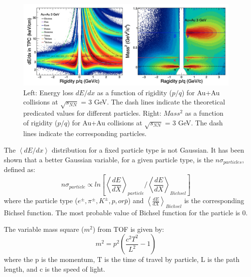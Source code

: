 \begin{figure}[ht]
\includegraphics [scale=0.3]{chapter2/fig/dedx_3gev.png}
\caption{Left: Energy loss $dE/dx$ as a function of rigidity ($p/q$) for Au+Au collisions at $\sqrt{s_{NN}}$ = 3 GeV. The dash lines indicate the theoretical predicated values for different particles. Right: $Mass^{2}$ as a function of rigidity ($p/q$) for Au+Au collisions at $\sqrt{s_{NN}}$ = 3 GeV. The dash lines indicate the corresponding particles.}
\label{fig:dedx_mass2_3gev} 
\end{figure}

The $\left<dE/dx\right>$ distribution for a fixed particle type is not Gaussian. It has been shown that a better Gaussian variable, for a given particle type, is the $n\sigma_{particles}$, defined as:
\begin{equation}
	n\sigma_{particle} \propto ln \left[ \left< \frac{dE}{dX} \right>_{particle} / 
	\left< \frac{dE}{dX} \right>_{Bichsel} \right]
\end{equation}
where the particle type ($e^{\pm}, \pi^{\pm}, K^{\pm}, p, or  \bar{p}$) and $\left< \frac{dE}{dX} \right>_{Bichsel}$ is the corresponding Bichsel function. The most probable value of Bichsel function for the particle is 0.

The variable mass square ($m^{2}$) from TOF is given by:
\begin{equation} 
	m^{2} = p^{2} \left( \frac{c^{2}T^{2}}{L^{2}}-1 \right)
	\label{mass2_equ}
\end{equation}
where the p is the momentum, T is the time of travel by particle, L is the path length, and c is the speed of light.

